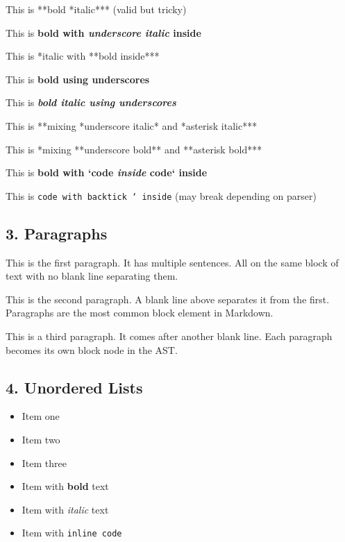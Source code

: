 \documentclass{article}
\begin{document}
This is **bold *italic*** (valid but tricky)

This is \textbf{bold with \emph{underscore italic} inside}

This is *italic with **bold inside***

This is \textbf{bold using underscores}

This is \textbf{\emph{bold italic using underscores}}

This is **mixing *underscore italic* and *asterisk italic***

This is *mixing **underscore bold** and **asterisk bold***

This is \textbf{bold with `code \emph{inside} code` inside}

This is \texttt{code with backtick ` inside} (may break depending on parser)

\subsection{ 3. Paragraphs}

This is the first paragraph. It has multiple sentences. All on the same block of text with no blank line separating them.

This is the second paragraph. A blank line above separates it from the first. Paragraphs are the most common block element in Markdown.

This is a third paragraph. It comes after another blank line. Each paragraph becomes its own block node in the AST.

\subsection{ 4. Unordered Lists}

\begin{itemize}
\item  Item one
\item  Item two
\item  Item three
\end{itemize}

\begin{itemize}
\item  Item with \textbf{bold} text
\item  Item with \emph{italic} text
\item  Item with \texttt{inline code}
\end{itemize}
\end{document}
